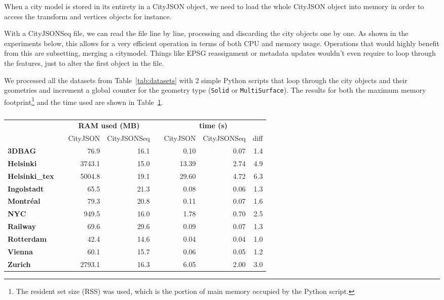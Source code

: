 \documentclass{isprs} %
\begin{document}
When a city model is stored in its entirety in a CityJSON object, we need to load the whole CityJSON object into memory in order to access the transform and vertices objects for instance.

With a CityJSONSeq file, we can read the file line by line, processing and discarding the city objects one by one.
As shown in the experiments below, this allows for a very efficient operation in terms of both CPU and memory usage.
Operations that would highly benefit from this are subsetting, merging a citymodel.
Things like EPSG reassignment or metadata updates wouldn't even require to loop through the features, just to alter the first object in the file.

We processed all the datasets from Table~\ref{tab:datasets} with 2 simple Python scripts that loop through the city objects and their geometries and increment a global counter for the geometry type (\texttt{Solid} or \texttt{MultiSurface}).
The results for both the maximum memory footprint\footnote{The resident set size (RSS) was used, which is the portion of main memory occupied by the Python script.} and the time used are shown in Table~\ref{tab:ramtime}.
\begin{table}
  \centering
  \caption{}
  \small
  \begin{tabular}
    {@{}lcrrcrrr@{}}\toprule
    &&  \multicolumn{2}{c}{\textbf{RAM used (MB)}} && \multicolumn{3}{c}{\textbf{time (s)}} \\ 
    \cmidrule{3-4} \cmidrule{6-8} 
     && CityJSON & CityJSONSeq && CityJSON & CityJSONSeq & diff \\
    \midrule
     \textbf{3DBAG}         &&   76.9 & 16.1  &&   0.10 & 0.07 & 1.4 \\
     \textbf{Helsinki}      && 3743.1 & 15.0  &&  13.39 & 2.74 & 4.9 \\
     \textbf{Helsinki\_tex} && 5004.8 & 19.1  &&  29.60 & 4.72 & 6.3 \\
     \textbf{Ingolstadt}    &&   65.5 & 21.3  &&   0.08 & 0.06 & 1.3 \\
     \textbf{Montréal}      &&   79.3 & 20.8  &&   0.11 & 0.07 & 1.6 \\
     \textbf{NYC}           &&  949.5 & 16.0  &&   1.78 & 0.70 & 2.5 \\
     \textbf{Railway}       &&   69.6 & 29.6  &&   0.09 & 0.07 & 1.3 \\
     \textbf{Rotterdam}     &&   42.4 & 14.6  &&   0.04 & 0.04 & 1.0 \\
     \textbf{Vienna}        &&   60.1 & 15.7  &&   0.06 & 0.05 & 1.2 \\
     \textbf{Zurich}        && 2793.1 & 16.3  &&   6.05 & 2.00 & 3.0 \\
    \bottomrule
  \end{tabular}%
  \label{tab:ramtime}
\end{table}
\end{document}
